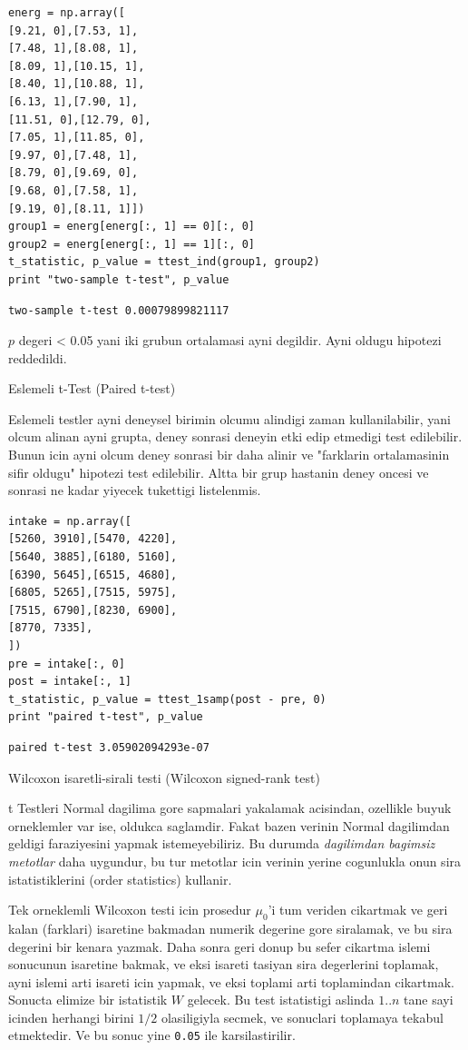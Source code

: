 \documentclass[12pt,fleqn]{article}\usepackage{../common}
\begin{document}
\begin{verbatim}
energ = np.array([
[9.21, 0],[7.53, 1],
[7.48, 1],[8.08, 1],
[8.09, 1],[10.15, 1],
[8.40, 1],[10.88, 1],
[6.13, 1],[7.90, 1],
[11.51, 0],[12.79, 0],
[7.05, 1],[11.85, 0],
[9.97, 0],[7.48, 1],
[8.79, 0],[9.69, 0],
[9.68, 0],[7.58, 1],
[9.19, 0],[8.11, 1]])
group1 = energ[energ[:, 1] == 0][:, 0]
group2 = energ[energ[:, 1] == 1][:, 0]
t_statistic, p_value = ttest_ind(group1, group2)
print "two-sample t-test", p_value
\end{verbatim}

\begin{verbatim}
two-sample t-test 0.00079899821117
\end{verbatim}

$p$ degeri < 0.05 yani iki grubun ortalamasi ayni degildir. Ayni oldugu
hipotezi reddedildi.

Eslemeli t-Test (Paired t-test)

Eslemeli testler ayni deneysel birimin olcumu alindigi zaman
kullanilabilir, yani olcum alinan ayni grupta, deney sonrasi deneyin
etki edip etmedigi test edilebilir. Bunun icin ayni olcum deney
sonrasi bir daha alinir ve "farklarin ortalamasinin sifir oldugu"
hipotezi test edilebilir. Altta bir grup hastanin deney oncesi ve
sonrasi ne kadar yiyecek tukettigi listelenmis. 

\begin{verbatim}
intake = np.array([
[5260, 3910],[5470, 4220],
[5640, 3885],[6180, 5160],
[6390, 5645],[6515, 4680],
[6805, 5265],[7515, 5975],
[7515, 6790],[8230, 6900],
[8770, 7335],
])
pre = intake[:, 0]
post = intake[:, 1]
t_statistic, p_value = ttest_1samp(post - pre, 0)
print "paired t-test", p_value
\end{verbatim}

\begin{verbatim}
paired t-test 3.05902094293e-07
\end{verbatim}

Wilcoxon isaretli-sirali testi (Wilcoxon signed-rank test)

t Testleri Normal dagilima gore sapmalari yakalamak acisindan,
ozellikle buyuk orneklemler var ise, oldukca saglamdir. Fakat bazen
verinin Normal dagilimdan geldigi faraziyesini yapmak istemeyebiliriz.
Bu durumda {\em dagilimdan bagimsiz metotlar} daha uygundur, bu tur
metotlar icin verinin yerine cogunlukla onun sira istatistiklerini
(order statistics) kullanir.

Tek orneklemli Wilcoxon testi icin prosedur $\mu_0$'i tum veriden
cikartmak ve geri kalan (farklari) isaretine bakmadan numerik degerine
gore siralamak, ve bu sira degerini bir kenara yazmak. Daha sonra geri
donup bu sefer cikartma islemi sonucunun isaretine bakmak, ve eksi
isareti tasiyan sira degerlerini toplamak, ayni islemi arti isareti
icin yapmak, ve eksi toplami arti toplamindan cikartmak. Sonucta
elimize bir istatistik $W$ gelecek. Bu test istatistigi aslinda $1..n$
tane sayi icinden herhangi birini $1/2$ olasiligiyla secmek, ve
sonuclari toplamaya tekabul etmektedir. Ve bu sonuc yine \verb!0.05!
ile karsilastirilir.
\end{document}
